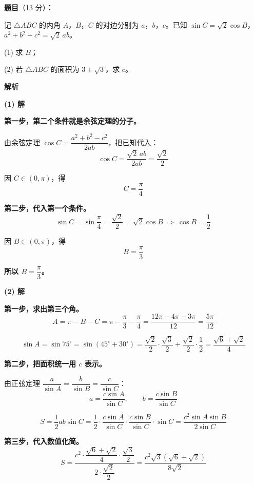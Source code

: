 \begin{answer}

\textbf{题目}（13 分）：

记 $\triangle ABC$ 的内角 $A$，$B$，$C$ 的对边分别为 $a$，$b$，$c$。已知 $\sin C=\sqrt2\cos B$，$a^{2}+b^{2}-c^{2}=\sqrt2\,ab$。

  (1) 求 $B$；

  (2) 若 $\triangle ABC$ 的面积为 $3+\sqrt3$，求 $c$。

\textbf{解析}

\par\medskip

\textbf{(1) 解}

\textbf{第一步，第二个条件就是余弦定理的分子。}

由余弦定理 $\cos C=\dfrac{a^{2}+b^{2}-c^{2}}{2ab}$，把已知代入：
\nopagebreak[4]
\[\cos C=\frac{\sqrt2\,ab}{2ab}=\frac{\sqrt2}2\]

因 $C\in(0,\pi)$，得
\nopagebreak[4]
\[C=\frac\pi4\]

\textbf{第二步，代入第一个条件。}
\nopagebreak[4]
\[\sin C=\sin\frac\pi4=\frac{\sqrt2}2=\sqrt2\cos B\ \Longrightarrow\ \cos B=\frac12\]

因 $B\in(0,\pi)$，得
\nopagebreak[4]
\[B=\frac\pi3\]

\textbf{所以 $B=\dfrac\pi3$。}

\par\medskip

\textbf{(2) 解}

\textbf{第一步，求出第三个角。}
\nopagebreak[4]
\[A=\pi-B-C=\pi-\frac\pi3-\frac\pi4=\frac{12\pi-4\pi-3\pi}{12}=\frac{5\pi}{12}\]

\nopagebreak[4]
\[\sin A=\sin75^{\circ}=\sin\left(45^{\circ}+30^{\circ}\right)=\frac{\sqrt2}2\cdot\frac{\sqrt3}2+\frac{\sqrt2}2\cdot\frac12=\frac{\sqrt6+\sqrt2}4\]

\textbf{第二步，把面积统一用 $c$ 表示。}

由正弦定理 $\dfrac a{\sin A}=\dfrac b{\sin B}=\dfrac c{\sin C}$：
\nopagebreak[4]
\[a=\frac{c\sin A}{\sin C},\qquad b=\frac{c\sin B}{\sin C}\]

\nopagebreak[4]
\[S=\frac12ab\sin C=\frac12\cdot\frac{c\sin A}{\sin C}\cdot\frac{c\sin B}{\sin C}\cdot\sin C=\frac{c^{2}\sin A\sin B}{2\sin C}\]

\textbf{第三步，代入数值化简。}
\nopagebreak[4]
\[S=\frac{c^{2}\cdot\dfrac{\sqrt6+\sqrt2}4\cdot\dfrac{\sqrt3}2}{2\cdot\dfrac{\sqrt2}2}=\frac{c^{2}\sqrt3\left(\sqrt6+\sqrt2\right)}{8\sqrt2}\]


\end{answer}
